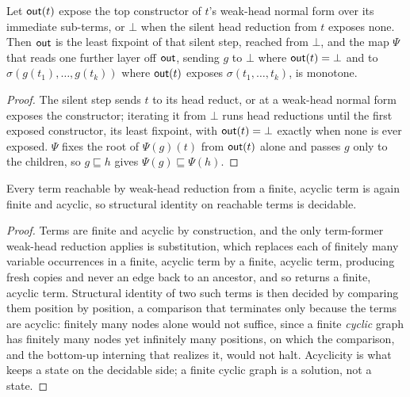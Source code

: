 \begin{lemma}\label{lem:mono-llt}
  Let $\mathsf{out}(t)$ expose the top constructor of $t$'s weak-head normal form over its immediate sub-terms, or $\bot$ when the silent head reduction from $t$ exposes none. Then $\mathsf{out}$ is the least fixpoint of that silent step, reached from $\bot$, and the map $\Psi$ that reads one further layer off $\mathsf{out}$, sending $g$ to $\bot$ where $\mathsf{out}(t) = \bot$ and to $\sigma(g(t_1), \dots, g(t_k))$ where $\mathsf{out}(t)$ exposes $\sigma(t_1, \dots, t_k)$, is monotone.
\end{lemma}
\begin{proof}
  The silent step sends $t$ to its head reduct, or at a weak-head normal form exposes the constructor; iterating it from $\bot$ runs head reductions until the first exposed constructor, its least fixpoint, with $\mathsf{out}(t) = \bot$ exactly when none is ever exposed. $\Psi$ fixes the root of $\Psi(g)(t)$ from $\mathsf{out}(t)$ alone and passes $g$ only to the children, so $g \sqsubseteq h$ gives $\Psi(g) \sqsubseteq \Psi(h)$.
\end{proof}

\begin{lemma}\label{lem:finite}
  Every term reachable by weak-head reduction from a finite, acyclic term is again finite and acyclic, so structural identity on reachable terms is decidable.
\end{lemma}
\begin{proof}
  Terms are finite and acyclic by construction, and the only term-former weak-head reduction applies is substitution, which replaces each of finitely many variable occurrences in a finite, acyclic term by a finite, acyclic term, producing fresh copies and never an edge back to an ancestor, and so returns a finite, acyclic term. Structural identity of two such terms is then decided by comparing them position by position, a comparison that terminates only because the terms are acyclic: finitely many nodes alone would not suffice, since a finite \emph{cyclic} graph has finitely many nodes yet infinitely many positions, on which the comparison, and the bottom-up interning that realizes it, would not halt. Acyclicity is what keeps a state on the decidable side; a finite cyclic graph is a solution, not a state.
\end{proof}

